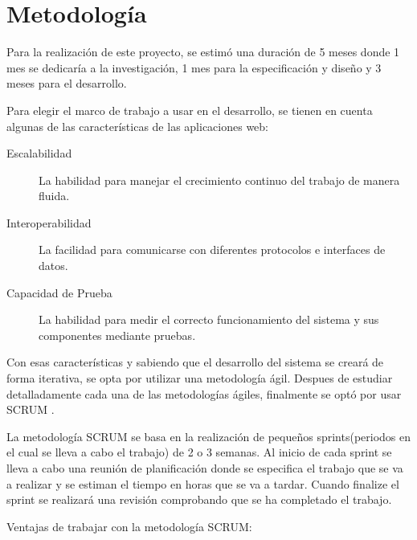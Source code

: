 \chapter{Metodología}

Para la realización de este proyecto, se estimó una duración de 5 meses donde 1 mes se dedicaría a la investigación, 1 mes para la especificación y diseño y 3 meses para el desarrollo. 

\vspace{5 mm}

Para elegir el marco de trabajo a usar en el desarrollo, se tienen en cuenta algunas de las características de las aplicaciones web:

\begin{description}

\item [Escalabilidad] La habilidad para manejar el crecimiento continuo del trabajo de manera fluida.  

\item [Interoperabilidad] La facilidad para comunicarse con diferentes protocolos e interfaces de datos. 

\item [Capacidad de Prueba] La habilidad para medir el correcto funcionamiento del sistema y sus componentes mediante pruebas. 

\end{description}


\vspace{5 mm}

Con esas características y sabiendo que el desarrollo del sistema se creará de forma iterativa, se opta por utilizar una metodología ágil. Despues de estudiar detalladamente cada una de las metodologías ágiles, finalmente se optó por usar SCRUM \cite{scrum}.

\vspace{5 mm}

La metodología SCRUM se basa en la realización de pequeños sprints(periodos en el cual se lleva a cabo el trabajo) de 2 o 3 semanas. Al inicio de cada sprint se lleva a cabo una reunión de planificación donde se especifica el trabajo que se va a realizar y se estiman el tiempo en horas que se va a tardar. Cuando finalize el sprint se realizará una revisión comprobando que se ha completado el trabajo.

\vspace{5 mm}

Ventajas de trabajar con la metodología SCRUM:

